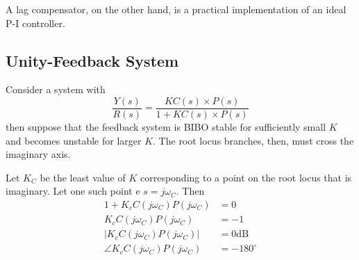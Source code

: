 \documentclass[12pt]{article}
\begin{document}
A lag compensator, on the other hand, is a practical implementation of an ideal P-I controller.

\subsection{Unity-Feedback System}
Consider a system with \[ \frac{Y(s)}{R(s)} = \frac{KC(s) \times P(s)}{1 + KC(s) \times P(s)} \] then suppose that the feedback system is BIBO stable for sufficiently small $K$ and becomes unstable for larger $K$. The root locus branches, then, must cross the imaginary axis.

Let $K_C$ be the least value of $K$ corresponding to a point on the root locus that is imaginary. Let one such point e $s = j\omega_C$. Then
\begin{align*}
1 + K_c C(j\omega_C)P(j\omega_C) &= 0 \\
K_c C(j\omega_C)P(j\omega_C) &= -1 \\
\bigl| K_c C(j\omega_C)P(j\omega_C) \bigl| &= 0\text{dB} \\
\angle K_c C(j\omega_C)P(j\omega_C) &= -180^\circ
\end{align*}
\end{document}
